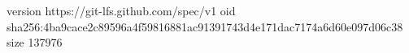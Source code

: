 version https://git-lfs.github.com/spec/v1
oid sha256:4ba9cace2c89596a4f59816881ac91391743d4e171dac7174a6d60e097d06c38
size 137976
